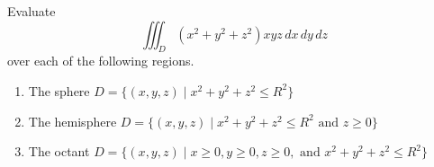 \documentclass[openany]{book}
\begin{document}
\begin{prob}[24]
    Evaluate
    \[
    \iiint_{D} (x^2 + y^2 + z^2) xyz \, dx \, dy \, dz
    \]
    over each of the following regions.

    \begin{enumerate}
        \item[(a)] The sphere \( D = \{(x, y, z) \mid x^2 + y^2 + z^2 \leq R^2\} \)
        \item[(b)] The hemisphere \( D = \{(x, y, z) \mid x^2 + y^2 + z^2 \leq R^2 \text{ and } z \geq 0\} \)
        \item[(c)] The octant \( D = \{(x, y, z) \mid x \geq 0, y \geq 0, z \geq 0, \text{ and } x^2 + y^2 + z^2 \leq R^2\} \)
    \end{enumerate}
\end{prob}
\end{document}
